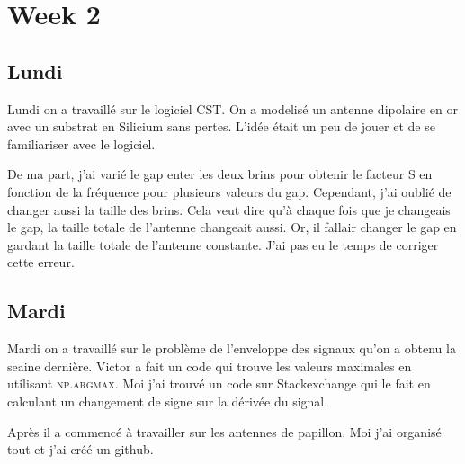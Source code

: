 \section{Week 2}

\subsection{Lundi}

Lundi on a travaillé sur le logiciel CST. On a modelisé un antenne
dipolaire en or avec un substrat en Silicium sans pertes. L'idée
était un peu de jouer et de se familiariser avec le logiciel.

De ma part, j'ai varié le gap enter les deux brins pour obtenir le facteur S
en fonction de la fréquence pour plusieurs valeurs du gap. Cependant, j'ai oublié
de changer aussi la taille des brins. Cela veut dire qu'à chaque fois que je changeais
le gap, la taille totale de l'antenne changeait aussi. Or, il fallair changer le gap
en gardant la taille totale de l'antenne constante. J'ai pas eu le temps de corriger 
cette erreur.

\subsection{Mardi}

Mardi on a travaillé sur le problème de l'enveloppe des signaux qu'on a obtenu la
seaine dernière. Victor a fait un code qui trouve les valeurs maximales en utilisant
\textsc{np.argmax}. Moi j'ai trouvé un code sur Stackexchange qui le fait en calculant
un changement de signe sur la dérivée du signal. 

Après il a commencé à travailler sur les antennes de papillon. Moi j'ai organisé tout et 
j'ai créé un github.